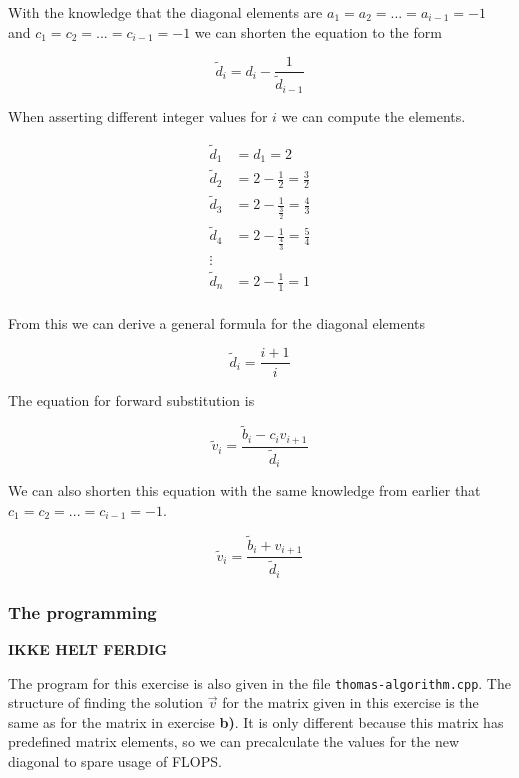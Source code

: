 \documentclass{article}
\begin{document}
    With the knowledge that the diagonal elements are $a_1 = a_2 = ... = a_{i-1} = -1 $ and $c_1 = c_2 = ... = c_{i-1} = -1$ we can shorten the equation to the form

    \begin{equation*}
      \tilde{d}_i = d_i - \frac{1}{\tilde{d}_{i-1}}
    \end{equation*}

    When asserting different integer values for $i$ we can compute the elements.

    \begin{align*}
      \tilde{d}_1 &= d_1 = 2 \\
      \tilde{d}_2 &= 2 - \frac{1}{2} = \frac{3}{2} \\
      \tilde{d}_3 &= 2 - \frac{1}{\frac{3}{2}} = \frac{4}{3} \\
      \tilde{d}_4 &= 2 - \frac{1}{\frac{4}{3}} = \frac{5}{4} \\
      \vdots \\
      \tilde{d}_n &= 2 - \frac{1}{1} = 1 \\
    \end{align*}

    From this we can derive a general formula for the diagonal elements

    \begin{equation*}
      \tilde{d}_i = \frac{i+1}{i}
    \end{equation*}

    The equation for forward substitution is

    \begin{equation*}
      \tilde{v}_i = \frac{\tilde{b}_i - c_i v_{i+1}}{\tilde{d}_i}
    \end{equation*}

    We can also shorten this equation with the same knowledge from earlier that $c_1 = c_2 = ... = c_{i-1} = -1$.

    \begin{equation*}
      \tilde{v}_i = \frac{\tilde{b}_i + v_{i+1}}{\tilde{d}_i}
    \end{equation*}

  \subsubsection{The programming}

  {\large \bf IKKE HELT FERDIG}

    The program for this exercise is also given in the file \texttt{thomas-algorithm.cpp}. The structure of finding the solution $\vec{v}$ for the matrix given in this exercise is the same as for the matrix in exercise \textbf{b)}. It is only different because this matrix has predefined matrix elements, so we can precalculate the values for the new diagonal to spare usage of FLOPS.
\end{document}
